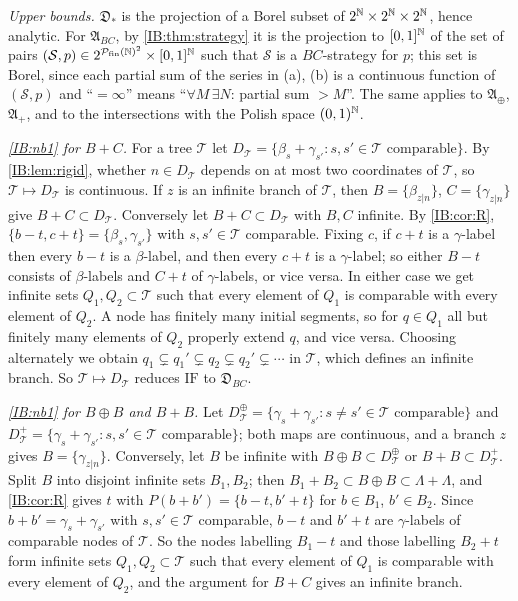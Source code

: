 \emph{Upper bounds.} $\mathfrak D_\ast$ is the projection of a Borel subset of
$2^{\mathbb{N}}\times2^{\mathbb{N}}\times2^{\mathbb{N}}$, hence analytic. For $\mathfrak A_{BC}$, by \cref{IB:thm:strategy} it is
the projection to $[0,1]^{\mathbb{N}}$ of the set of pairs $(\mathcal S,p)\in2^{\mathcal P_{\rm fin}(\mathbb{N})^2}\times[0,1]^{\mathbb{N}}$
such that $\mathcal S$ is a $BC$-strategy for $p$; this set is Borel, since each partial
sum of the series in (a), (b) is a continuous function of $(\mathcal S,p)$ and
``$=\infty$'' means ``$\forall M\,\exists N$: partial sum $>M$''. The same applies to $\mathfrak A_\oplus$,
$\mathfrak A_+$, and to the intersections with the Polish space $(0,1)^{\mathbb{N}}$.

\emph{\ref{IB:nb1} for $B+C$.} For a tree $\mathcal T$ let
$D_{\mathcal T}=\{\beta_s+\gamma_{s'}: s,s'\in\mathcal T\text{ comparable}\}$. By \cref{IB:lem:rigid}, whether
$n\in D_{\mathcal T}$ depends on at most two coordinates of $\mathcal T$, so $\mathcal T\mapsto D_{\mathcal T}$ is
continuous. If $z$ is an infinite branch of $\mathcal T$, then $B=\{\beta_{z|n}\}$,
$C=\{\gamma_{z|n}\}$ give $B+C\subset D_{\mathcal T}$. Conversely let $B+C\subset D_{\mathcal T}$ with $B,C$
infinite. By \cref{IB:cor:R}, $\{b-t,c+t\}=\{\beta_s,\gamma_{s'}\}$ with $s,s'\in\mathcal T$
comparable. Fixing $c$, if $c+t$ is a $\gamma$-label then every $b-t$ is a $\beta$-label, and
then every $c+t$ is a $\gamma$-label; so either $B-t$ consists of $\beta$-labels and $C+t$ of
$\gamma$-labels, or vice versa. In either case we get infinite sets $Q_1,Q_2\subset\mathcal T$ such
that every element of $Q_1$ is comparable with every element of $Q_2$. A node has
finitely many initial segments, so for $q\in Q_1$ all but finitely many elements of
$Q_2$ properly extend $q$, and vice versa. Choosing alternately we obtain
$q_1\subsetneq q_1'\subsetneq q_2\subsetneq q_2'\subsetneq\cdots$ in $\mathcal T$, which defines an infinite branch.
So $\mathcal T\mapsto D_{\mathcal T}$ reduces $\mathrm{IF}$ to $\mathfrak D_{BC}$.

\emph{\ref{IB:nb1} for $B\oplus B$ and $B+B$.} Let
$D^\oplus_{\mathcal T}=\{\gamma_s+\gamma_{s'}:s\ne s'\in\mathcal T\text{ comparable}\}$ and
$D^+_{\mathcal T}=\{\gamma_s+\gamma_{s'}:s,s'\in\mathcal T\text{ comparable}\}$; both maps are continuous, and a
branch $z$ gives $B=\{\gamma_{z|n}\}$. Conversely, let $B$ be infinite with
$B\oplus B\subset D^\oplus_{\mathcal T}$ or $B+B\subset D^+_{\mathcal T}$. Split $B$ into disjoint infinite sets
$B_1,B_2$; then $B_1+B_2\subset B\oplus B\subset\Lambda+\Lambda$, and \cref{IB:cor:R} gives $t$ with
$P(b+b')=\{b-t,b'+t\}$ for $b\in B_1$, $b'\in B_2$. Since $b+b'=\gamma_s+\gamma_{s'}$ with $s,s'\in\mathcal T$
comparable, $b-t$ and $b'+t$ are $\gamma$-labels of comparable nodes of $\mathcal T$. So the nodes
labelling $B_1-t$ and those labelling $B_2+t$ form infinite sets $Q_1,Q_2\subset\mathcal T$ such that every
element of $Q_1$ is comparable with every element of $Q_2$, and the argument for $B+C$ gives an
infinite branch.

